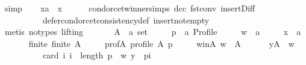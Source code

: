 \begin{isabellebody}
\ simp\isanewline
\ \ \isamarkupfalse%
\ {\isachardoublequoteopen}xa\ {\isacharequal}{\kern0pt}\ x{\isachardoublequoteclose}\isanewline
\ \ \ \ \isamarkupfalse%
\ condorcet{\isacharunderscore}{\kern0pt}winner{\isachardot}{\kern0pt}simps\ dcc\ fst{\isacharunderscore}{\kern0pt}conv\ insert{\isacharunderscore}{\kern0pt}Diff\ {\isachardoublequoteopen}{}{\isachardoublequoteclose}\isanewline
\ \ \ \ \ \ \ \ \ \ defer{\isacharunderscore}{\kern0pt}condorcet{\isacharunderscore}{\kern0pt}consistency{\isacharunderscore}{\kern0pt}def\ insert{\isacharunderscore}{\kern0pt}not{\isacharunderscore}{\kern0pt}empty\isanewline
\ \ \ \ \isamarkupfalse%
\ {\isacharparenleft}{\kern0pt}metis\ {\isacharparenleft}{\kern0pt}no{\isacharunderscore}{\kern0pt}types{\isacharcomma}{\kern0pt}\ lifting{\isacharparenright}{\kern0pt}{\isacharparenright}{\kern0pt}\isanewline
{}\isamarkupfalse%
\isanewline
\ \ \isamarkupfalse%
\isanewline
\ \ \ \ A\ {\isacharcolon}{\kern0pt}{\isacharcolon}{\kern0pt}\ {\isachardoublequoteopen}{\isacharprime}{\kern0pt}a\ set{\isachardoublequoteclose}\ \isanewline
\ \ \ \ p\ {\isacharcolon}{\kern0pt}{\isacharcolon}{\kern0pt}\ {\isachardoublequoteopen}{\isacharprime}{\kern0pt}a\ Profile{\isachardoublequoteclose}\ \isanewline
\ \ \ \ w\ {\isacharcolon}{\kern0pt}{\isacharcolon}{\kern0pt}\ {\isachardoublequoteopen}{\isacharprime}{\kern0pt}a{\isachardoublequoteclose}\ \isanewline
\ \ \ \ x\ {\isacharcolon}{\kern0pt}{\isacharcolon}{\kern0pt}\ {\isachardoublequoteopen}{\isacharprime}{\kern0pt}a{\isachardoublequoteclose}\isanewline
\ \ \isamarkupfalse%
\isanewline
\ \ \ \ finite{\isacharcolon}{\kern0pt}\ {\isachardoublequoteopen}finite\ A{\isachardoublequoteclose}\ \isanewline
\ \ \ \ prof{\isacharunderscore}{\kern0pt}A{\isacharcolon}{\kern0pt}\ {\isachardoublequoteopen}profile\ A\ p{\isachardoublequoteclose}\ \isanewline
\ \ \ \ w{\isacharunderscore}{\kern0pt}in{\isacharunderscore}{\kern0pt}A{\isacharcolon}{\kern0pt}\ {\isachardoublequoteopen}w\ {\isasymin}\ A{\isachardoublequoteclose}\ \isanewline
\ \ \ \ {}{\isacharcolon}{\kern0pt}\ {\isachardoublequoteopen}{\isasymforall}y{\isasymin}A\ {\isacharminus}{\kern0pt}\ {\isacharbraceleft}{\kern0pt}w{\isacharbraceright}{\kern0pt}{\isachardot}{\kern0pt}\isanewline
\ \ \ \ \ \ \ \ \ \ card\ {\isacharbraceleft}{\kern0pt}i{\isachardot}{\kern0pt}\ i\ {\isacharless}{\kern0pt}\ length\ p\ {\isasymand}\ {\isacharparenleft}{\kern0pt}w{\isacharcomma}{\kern0pt}\ y{\isacharparenright}{\kern0pt}\ {\isasymin}\ {\isacharparenleft}{\kern0pt}p{\isacharbang}{\kern0pt}i{\isacharparenright}{\kern0pt}{\isacharbraceright}{\kern0pt}\ {\isacharless}{\kern0pt}\isanewline

\end{isabellebody}
